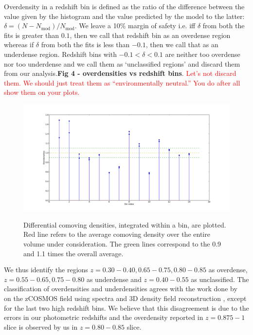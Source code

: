 \documentclass[twocolumn,useAMS,usenatbib]{mn2e}
\newcommand{\rachel}[1]{{\textcolor{red}{#1}}}
\begin{document}
Overdensity in a redshift bin is defined as the ratio of the difference between the value given by the histogram and the value predicted by the model to the latter: $\delta=(N-N_{\text{mod}})/N_{\text{mod}}$. 
We leave a 10\% margin of safety i.e. iff $\delta$ from both the fits is greater than $0.1$, then we call that redshift bin as an
overdense region whereas if $\delta$ from both the fits is less than $-0.1$, then we call that as an underdense region. Redshift bins with $-0.1 < \delta < 0.1$ are neither too overdense
nor too underdense and we call them as `unclassified regions'  and discard them from our analysis.{\bf Fig 4 - overdensities vs redshift bins}.
\rachel{Let's not discard them.  We should just treat them as
  ``environmentally neutral.''  You do after all show them on your plots.}

\begin{figure}
 \centering
 \includegraphics[width=\columnwidth]{fig4}
 \label{fig:comoving_densities}
 \caption{Differential comoving densities, integrated within a bin, are plotted. Red line refers to the average comoving density over the entire volume under consideration. 
          The green lines correspond to the 0.9 and 1.1 times the overall average.}
\end{figure}

We thus identify the regions $z=0.30-0.40, 0.65-0.75, 0.80-0.85$ as overdense, $z=0.55-0.65, 0.75-0.80$ as underdense and $z=0.40-0.55$ as unclassified.
The classification of overdensities and underdensities agrees with the work done by~\cite{Kovac_Density10k} on the zCOSMOS field using spectra and 3D density field reconstruction , except for the last two high redshift bins.
We believe that this disagreement is due to the errors in our photometric redshifts and the overdensity reported in $z=0.875-1$ slice
is observed by us in $z=0.80-0.85$ slice.
\end{document}
